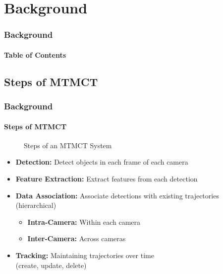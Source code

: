 \section{Background}
\begin{frame}
    \frametitle{Background}
    \framesubtitle{Table of Contents}
    {
        \hypersetup{hidelinks}
    }
\end{frame}

\subsection{Steps of MTMCT}
\begin{frame}
    \frametitle{Background}
    \framesubtitle{Steps of MTMCT}

    \begin{figure}[ht]
        \centering
        
        \caption{Steps of an MTMCT System}\label{fig:mtmct_steps}
    \end{figure}

    \begin{itemize}
        \item<2->\textbf{Detection:} Detect objects in each frame of each camera
              \vspace{5pt}
        \item<3->\textbf{Feature Extraction:} Extract features from each detection
              \vspace{5pt}
        \item<4->\textbf{Data Association:} Associate detections with existing trajectories (hierarchical)
              \begin{itemize}
                  \item \textbf{Intra-Camera:} Within each camera
                  \item \textbf{Inter-Camera:} Across cameras
              \end{itemize}
              \vspace{5pt}
        \item<5->\textbf{Tracking:} Maintaining trajectories over time\\(create, update, delete)
    \end{itemize}
\end{frame}

